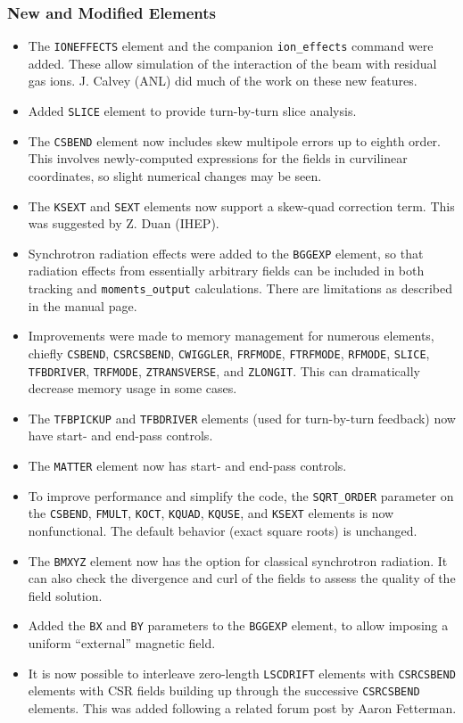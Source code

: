 \documentclass[11pt]{article}
\begin{document}
\subsubsection{New and Modified Elements}
\begin{itemize}
\item The \verb|IONEFFECTS| element and the companion \verb|ion_effects| command were added. These allow simulation
  of the interaction of the beam with residual gas ions. J. Calvey (ANL) did much of the work on these new features.
\item Added \verb|SLICE| element to provide turn-by-turn slice analysis.
\item The \verb|CSBEND| element now includes skew multipole errors up to eighth order. This involves newly-computed expressions for the
  fields in curvilinear coordinates, so slight numerical changes may be seen.
\item The \verb|KSEXT| and \verb|SEXT| elements now support a skew-quad correction term. This was suggested by Z. Duan (IHEP).
\item Synchrotron radiation effects were added to the \verb|BGGEXP| element, so that radiation effects from essentially 
  arbitrary fields can be included in both tracking and \verb|moments_output| calculations. There are limitations as
  described in the manual page.
\item Improvements were made to memory management for numerous elements, chiefly \verb|CSBEND|, \verb|CSRCSBEND|,
  \verb|CWIGGLER|, \verb|FRFMODE|, \verb|FTRFMODE|, \verb|RFMODE|, \verb|SLICE|, \verb|TFBDRIVER|, \verb|TRFMODE|,
  \verb|ZTRANSVERSE|, and \verb|ZLONGIT|. This can dramatically decrease memory usage in some cases.
\item The \verb|TFBPICKUP| and \verb|TFBDRIVER| elements (used for turn-by-turn feedback) now have start- and end-pass controls.
\item The \verb|MATTER| element now has start- and end-pass controls.
\item To improve performance and simplify the code, the \verb|SQRT_ORDER| parameter on the \verb|CSBEND|, 
  \verb|FMULT|, \verb|KOCT|, \verb|KQUAD|, \verb|KQUSE|, and \verb|KSEXT| elements is now nonfunctional.
  The default behavior (exact square roots) is unchanged.
\item The \verb|BMXYZ| element now has the option for classical synchrotron radiation. It can also check the
  divergence and curl of the fields to assess the quality of the field solution.
\item Added the \verb|BX| and \verb|BY| parameters to the \verb|BGGEXP| element, to allow imposing a uniform ``external''
  magnetic field. 
\item It is now possible to interleave zero-length \verb|LSCDRIFT| elements with \verb|CSRCSBEND| elements with
  CSR fields building up through the successive \verb|CSRCSBEND| elements. This was added following a related
  forum post by Aaron Fetterman.
\end{itemize}
\end{document}
